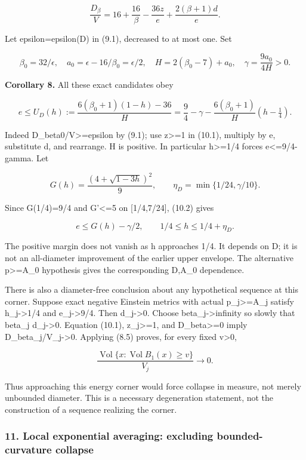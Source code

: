 \documentclass[
  10pt,
]{article}
\begin{document}
\[
 \frac{D_\beta}{V}=16+\frac{16}{\beta}-\frac{36z}{e}
                         +\frac{2(\beta+1)d}{e}.       \tag{10.1}
\]

Let epsilon=epsilon(D) in (9.1), decreased to at most one. Set

\[
 \beta_0=32/\epsilon,\quad a_0=\epsilon-16/\beta_0=\epsilon/2,
 \quad H=2(\beta_0-7)+a_0,\quad
 \gamma=\frac{9a_0}{4H}>0.
\]

\textbf{Corollary 8.} All these exact candidates obey

\[
 \boxed{e\le U_D(h):=
       \frac{6(\beta_0+1)(1-h)-36}{H}
       =\frac94-\gamma-
          \frac{6(\beta_0+1)}H(h-\tfrac14).}           \tag{10.2}
\]

Indeed D\_beta0/V\textgreater=epsilon by (9.1); use z\textgreater=1 in
(10.1), multiply by e, substitute d, and rearrange. H is positive. In
particular h\textgreater=1/4 forces e\textless=9/4-gamma. Let

\[
 G(h)=\frac{(4+\sqrt{1-3h})^2}{9},\qquad
 \eta_D=\min\{1/24,\gamma/10\}.
\]

Since G(1/4)=9/4 and \textbar G'\textbar\textless=5 on {[}1/4,7/24{]},
(10.2) gives

\[
 \boxed{e\le G(h)-\gamma/2,
              \qquad 1/4\le h\le1/4+\eta_D.}          \tag{10.3}
\]

The positive margin does not vanish as h approaches 1/4. It depends on
D; it is not an all-diameter improvement of the earlier upper envelope.
The alternative p\textgreater=A\_0 hypothesis gives the corresponding
D,A\_0 dependence.

There is also a diameter-free conclusion about any hypothetical sequence
at this corner. Suppose exact negative Einstein metrics with actual
p\_j\textgreater=A\_j satisfy h\_j-\textgreater1/4 and
e\_j-\textgreater9/4. Then d\_j-\textgreater0. Choose
beta\_j-\textgreater infinity so slowly that beta\_j d\_j-\textgreater0.
Equation (10.1), z\_j\textgreater=1, and D\_beta\textgreater=0 imply
D\_beta\_j/V\_j-\textgreater0. Applying (8.5) proves, for every fixed
v\textgreater0,

\[
 \frac{\operatorname{Vol}\{x:\operatorname{Vol}B_1(x)\ge v\}}{V_j}
                        \longrightarrow0.            \tag{10.4}
\]

Thus approaching this energy corner would force collapse in measure, not
merely unbounded diameter. This is a necessary degeneration statement,
not the construction of a sequence realizing the corner.

\hypertarget{local-exponential-averaging-excluding-bounded-curvature-collapse}{%
\subsubsection{11. Local exponential averaging: excluding
bounded-curvature
collapse}\label{local-exponential-averaging-excluding-bounded-curvature-collapse}}
\end{document}
